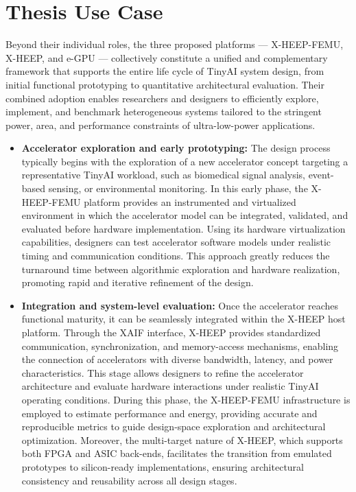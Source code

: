     \section{Thesis Use Case}
    
        Beyond their individual roles, the three proposed platforms --- \mbox{X-HEEP-FEMU}, \mbox{X-HEEP}, and \mbox{e-GPU} --- collectively constitute a unified and complementary framework that supports the entire life cycle of TinyAI system design, from initial functional prototyping to quantitative architectural evaluation. Their combined adoption enables researchers and designers to efficiently explore, implement, and benchmark heterogeneous systems tailored to the stringent power, area, and performance constraints of ultra-low-power applications.
        
        \begin{itemize}
            \item \textbf{Accelerator exploration and early prototyping:} The design process typically begins with the exploration of a new accelerator concept targeting a representative TinyAI workload, such as biomedical signal analysis, event-based sensing, or environmental monitoring. In this early phase, the \mbox{X-HEEP-FEMU} platform provides an instrumented and virtualized environment in which the accelerator model can be integrated, validated, and evaluated before hardware implementation. Using its hardware virtualization capabilities, designers can test accelerator software models under realistic timing and communication conditions. This approach greatly reduces the turnaround time between algorithmic exploration and hardware realization, promoting rapid and iterative refinement of the design.
        
            \item \textbf{Integration and system-level evaluation:} Once the accelerator reaches functional maturity, it can be seamlessly integrated within the \mbox{X-HEEP} host platform. Through the XAIF interface, \mbox{X-HEEP} provides standardized communication, synchronization, and memory-access mechanisms, enabling the connection of accelerators with diverse bandwidth, latency, and power characteristics. This stage allows designers to refine the accelerator architecture and evaluate hardware interactions under realistic TinyAI operating conditions. During this phase, the \mbox{X-HEEP-FEMU} infrastructure is employed to estimate performance and energy, providing accurate and reproducible metrics to guide design-space exploration and architectural optimization. Moreover, the multi-target nature of \mbox{X-HEEP}, which supports both FPGA and ASIC back-ends, facilitates the transition from emulated prototypes to silicon-ready implementations, ensuring architectural consistency and reusability across all design stages.
        

\end{itemize}

